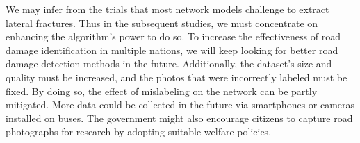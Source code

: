 \documentclass[sensors,article,submit,moreauthors]{Definitions/mdpi}
\begin{document}
    We may infer from the trials that most network models challenge to extract lateral fractures. Thus in the subsequent studies, we must concentrate on enhancing the algorithm's power to do so. To increase the effectiveness of road damage identification in multiple nations, we will keep looking for better road damage detection methods in the future. Additionally, the dataset's size and quality must be increased, and the photos that were incorrectly labeled must be fixed. By doing so, the effect of mislabeling on the network can be partly mitigated. More data could be collected in the future via smartphones or cameras installed on buses. The government might also encourage citizens to capture road photographs for research by adopting suitable welfare policies.


    \vspace{6pt}







\end{document}
